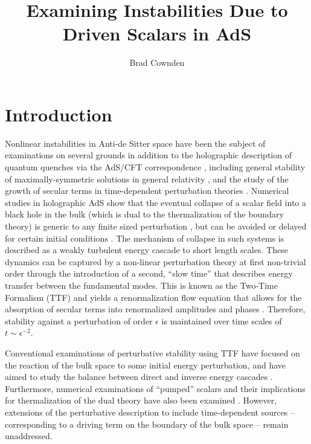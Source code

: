 \documentclass[letterpaper,11pt]{article}
\title{Examining Instabilities Due to Driven Scalars in AdS}
\author{Brad Cownden}
\affiliation{Department of Physics \& Astronomy\\ University of Manitoba,
Winnipeg, Manitoba R3T 2N2, Canada}
\begin{document}
\maketitle
\flushbottom
\newpage


\section{Introduction}

Nonlinear instabilities in Anti-de Sitter space have been the subject of examinations on several grounds in addition to  the holographic description of quantum quenches via the AdS/CFT correspondence \cite{ 1708.05600, 1501.00007}, including general stability of maximally-symmetric solutions in general relativity \cite{1104.3702, 1208.5772, 1706.06101}, and the study of the growth of secular terms in time-dependent perturbation theories \cite{hep-th/9506161, 1305.4117}. Numerical studies in holographic AdS show that the eventual collapse of a scalar field into a black hole in the bulk (which is dual to the thermalization of the boundary theory) is generic to any finite sized perturbation \cite{1104.3702, 1106.2339, 1108.4539}, but can be avoided or delayed for certain initial conditions \cite{1803.02830, 1711.00454, 1706.07413, 1508.02709}. The mechanism of collapse in such systems is described as a weakly turbulent energy cascade to short length scales. These dynamics can be captured by a non-linear perturbation theory at first non-trivial order through the introduction of a second, ``slow time'' that describes energy transfer between the fundamental modes. This is known as the Two-Time Formalism (TTF) \cite{1403.6471} and yields a renormalization flow equation that allows for the absorption of secular terms into renormalized amplitudes and phases \cite{1308.2132, 1508.05474, 1407.6273, 1412.3249, 1508.04943}. Therefore, stability against a perturbation of order $\epsilon$ is maintained over time scales of $t \sim \epsilon^{-2}$.

Conventional examinations of perturbative stability using TTF have focused on the reaction of the bulk space to some initial energy perturbation, and have aimed to study the balance between direct and inverse energy cascades \cite{1606.02712, 1612.04758, 1602.05859, 1507.08261, 1607.08094}. Furthermore, numerical examinations of ``pumped'' scalars and their implications for thermalization of the dual theory have also been examined \cite{1410.6201, 1712.07637, 1612.07701, 1502.05726, 1706.02438}. However, extensions of the perturbative description to include time-dependent sources -- corresponding to a driving term on the boundary of the bulk space -- remain unaddressed. 
\end{document}
